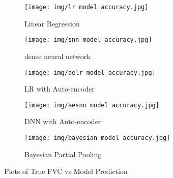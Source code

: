 \documentclass[12pt]{article}
\begin{document}
\begin{figure}[h!]
    \centering

    \begin{subfigure}{.32\textwidth}
        \centering
        \texttt{[image: img/lr model accuracy.jpg]}
        \caption{Linear Regression}
        \label{accuracy:lr}
    \end{subfigure}
    \begin{subfigure}{.32\textwidth}
        \centering
        \texttt{[image: img/snn model accuracy.jpg]}
        \caption{dense neural network}
        \label{accuracy:dnn}
    \end{subfigure}
    \begin{subfigure}{.32\textwidth}
        \centering
        \texttt{[image: img/aelr model accuracy.jpg]}
        \caption{LR with Auto-encoder}
        \label{accuracy:aelr}
    \end{subfigure}

    \vspace{0.5em}

    \begin{subfigure}{.33\textwidth}
        \centering
        \texttt{[image: img/aesnn model accuracy.jpg]}
        \caption{DNN with Auto-encoder}
        \label{accuracy:aednn}
    \end{subfigure}
    \begin{subfigure}{.33\textwidth}
        \centering
        \texttt{[image: img/bayesian model accuracy.jpg]}
        \caption{Bayesian Partial Pooling}
        \label{accuracy:bpp}
    \end{subfigure}

    \caption{Plots of True FVC vs Model Prediction}
    \label{accuracy graphs}
\end{figure}
\end{document}
